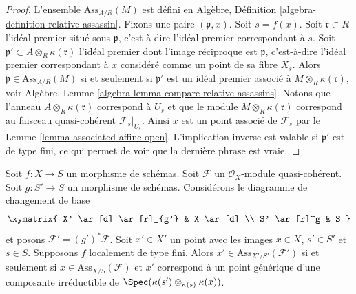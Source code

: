 \begin{proof}
L'ensemble  $\text{Ass}_{A/R}(M)$  est défini en Algèbre, Définition  \ref{algebra-definition-relative-assassin}. Fixons
une paire  $(\mathfrak p, x)$. Soit  $s = f(x)$. Soit  $\mathfrak r \subset R$  l'idéal premier situé sous
 $\mathfrak p$, c'est-à-dire l'idéal premier correspondant à  $s$. Soit
 $\mathfrak p' \subset A \otimes_R \kappa(\mathfrak r)$  l'idéal premier dont l'image réciproque est  $\mathfrak p$, c'est-à-dire l'idéal
premier correspondant à  $x$  considéré comme un point de sa fibre
 $X_s$. Alors  $\mathfrak p \in \text{Ass}_{A/R}(M)$  si et seulement si  $\mathfrak p'$  est un idéal premier
associé à  $M \otimes_R \kappa(\mathfrak r)$, voir Algèbre, Lemme  \ref{algebra-lemma-compare-relative-assassins}. Notons que l'anneau
 $A \otimes_R \kappa(\mathfrak r)$  correspond à  $U_s$  et que le module  $M \otimes_R \kappa(\mathfrak r)$  correspond au
faisceau quasi-cohérent  $\mathcal{F}_s|_{U_s}$. Ainsi  $x$  est un point associé de
 $\mathcal{F}_s$  par le Lemme  \ref{lemma-associated-affine-open}. L'implication inverse est valable si
 $\mathfrak p'$  est de type fini, ce qui permet de voir que la dernière phrase est
vraie.
\end{proof}

\begin{lemma}
\label{lemma-base-change-relative-assassin}
Soit  $f : X \to S$  un morphisme de schémas. Soit  $\mathcal{F}$  un
 $\mathcal{O}_X$-module quasi-cohérent. Soit  $g : S' \to S$  un morphisme de schémas.
Considérons le diagramme de changement de base
$$
\xymatrix{
X' \ar[d] \ar[r]_{g'} & X \ar[d] \\
S' \ar[r]^g & S
}
$$
et posons  $\mathcal{F}' = (g')^*\mathcal{F}$. Soit  $x' \in X'$  un point avec les images  $x \in X$,
 $s' \in S'$  et  $s \in S$. Supposons  $f$  localement de type fini.
Alors  $x' \in \text{Ass}_{X'/S'}(\mathcal{F}')$  si et seulement si  $x \in \text{Ass}_{X/S}(\mathcal{F})$  et  $x'$  correspond à un
point générique d'une composante irréductible de  $\Spec(\kappa(s') \otimes_{\kappa(s)} \kappa(x))$.
\end{lemma}

